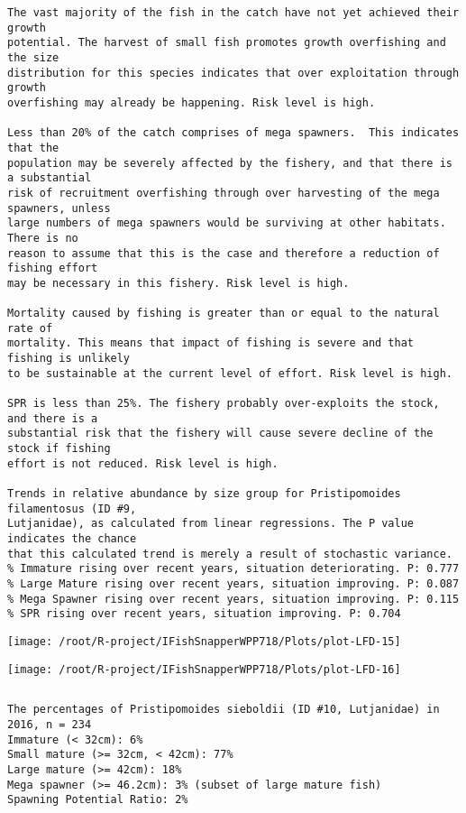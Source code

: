\documentclass{report}\usepackage[]{graphicx}\usepackage[]{color}
\makeatletter
\def\maxwidth{ %
  \ifdim\Gin@nat@width>\linewidth
    \linewidth
  \else
    \Gin@nat@width
  \fi
}
\newenvironment{kframe}{%
 \def\at@end@of@kframe{}%
 \ifinner\ifhmode%
  \def\at@end@of@kframe{\end{minipage}}%
  \begin{minipage}{\columnwidth}%
 \fi\fi%
 \def\FrameCommand##1{\hskip\@totalleftmargin \hskip-\fboxsep
 \colorbox{shadecolor}{##1}\hskip-\fboxsep
     \hskip-\linewidth \hskip-\@totalleftmargin \hskip\columnwidth}%
 \MakeFramed {\advance\hsize-\width
   \@totalleftmargin\z@ \linewidth\hsize
   \@setminipage}}%
 {\par\unskip\endMakeFramed%
 \at@end@of@kframe}
\newenvironment{knitrout}{}{} %
\makeatother
\begin{document}
\begin{knitrout}
\begin{kframe}
\begin{verbatim}
The vast majority of the fish in the catch have not yet achieved their growth
potential. The harvest of small fish promotes growth overfishing and the size
distribution for this species indicates that over exploitation through growth
overfishing may already be happening. Risk level is high.

Less than 20% of the catch comprises of mega spawners.  This indicates that the
population may be severely affected by the fishery, and that there is a substantial
risk of recruitment overfishing through over harvesting of the mega spawners, unless
large numbers of mega spawners would be surviving at other habitats. There is no
reason to assume that this is the case and therefore a reduction of fishing effort
may be necessary in this fishery. Risk level is high.
 
Mortality caused by fishing is greater than or equal to the natural rate of
mortality. This means that impact of fishing is severe and that fishing is unlikely
to be sustainable at the current level of effort. Risk level is high.
 
SPR is less than 25%. The fishery probably over-exploits the stock, and there is a
substantial risk that the fishery will cause severe decline of the stock if fishing
effort is not reduced. Risk level is high.
 
Trends in relative abundance by size group for Pristipomoides filamentosus (ID #9,
Lutjanidae), as calculated from linear regressions. The P value indicates the chance
that this calculated trend is merely a result of stochastic variance.
% Immature rising over recent years, situation deteriorating. P: 0.777
% Large Mature rising over recent years, situation improving. P: 0.087
% Mega Spawner rising over recent years, situation improving. P: 0.115
% SPR rising over recent years, situation improving. P: 0.704
\end{verbatim}
\end{kframe}
\texttt{[image: /root/R-project/IFishSnapperWPP718/Plots/plot-LFD-15]} 

\texttt{[image: /root/R-project/IFishSnapperWPP718/Plots/plot-LFD-16]} 
\begin{kframe}\begin{verbatim}
\end{verbatim}
\end{kframe}
\clearpage
\newpage
\begin{kframe}\begin{verbatim}The percentages of Pristipomoides sieboldii (ID #10, Lutjanidae) in 2016, n = 234
Immature (< 32cm): 6%
Small mature (>= 32cm, < 42cm): 77%
Large mature (>= 42cm): 18%
Mega spawner (>= 46.2cm): 3% (subset of large mature fish)
Spawning Potential Ratio: 2%
 

\end{verbatim}
\end{kframe}
\end{knitrout}
\end{document}
